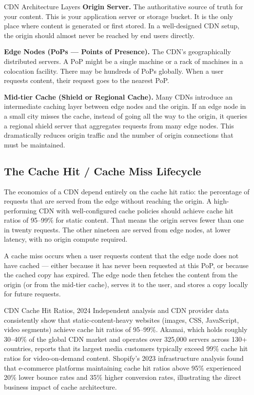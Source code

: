 \documentclass[11pt,a4paper]{article}
\begin{document}
\begin{termbox}{CDN Architecture Layers}
\textbf{Origin Server.} The authoritative source of truth for your content. This is your application server or storage bucket. It is the only place where content is generated or first stored. In a well-designed CDN setup, the origin should almost never be reached by end users directly.

\textbf{Edge Nodes (PoPs --- Points of Presence).} The CDN's geographically distributed servers. A PoP might be a single machine or a rack of machines in a colocation facility. There may be hundreds of PoPs globally. When a user requests content, their request goes to the nearest PoP.

\textbf{Mid-tier Cache (Shield or Regional Cache).} Many CDNs introduce an intermediate caching layer between edge nodes and the origin. If an edge node in a small city misses the cache, instead of going all the way to the origin, it queries a regional shield server that aggregates requests from many edge nodes. This dramatically reduces origin traffic and the number of origin connections that must be maintained.
\end{termbox}

\subsection{The Cache Hit / Cache Miss Lifecycle}

The economics of a CDN depend entirely on the cache hit ratio: the percentage of requests that are served from the edge without reaching the origin. A high-performing CDN with well-configured cache policies should achieve cache hit ratios of 95--99\% for static content. That means the origin serves fewer than one in twenty requests. The other nineteen are served from edge nodes, at lower latency, with no origin compute required.

A cache miss occurs when a user requests content that the edge node does not have cached --- either because it has never been requested at this PoP, or because the cached copy has expired. The edge node then fetches the content from the origin (or from the mid-tier cache), serves it to the user, and stores a copy locally for future requests.

\begin{industrybox}{CDN Cache Hit Ratios, 2024}
Independent analysis and CDN provider data consistently show that static-content-heavy websites (images, CSS, JavaScript, video segments) achieve cache hit ratios of 95--99\%. Akamai, which holds roughly 30--40\% of the global CDN market and operates over 325,000 servers across 130+ countries, reports that its largest media customers typically exceed 99\% cache hit ratios for video-on-demand content. Shopify's 2023 infrastructure analysis found that e-commerce platforms maintaining cache hit ratios above 95\% experienced 20\% lower bounce rates and 35\% higher conversion rates, illustrating the direct business impact of cache architecture.
\end{industrybox}
\end{document}
